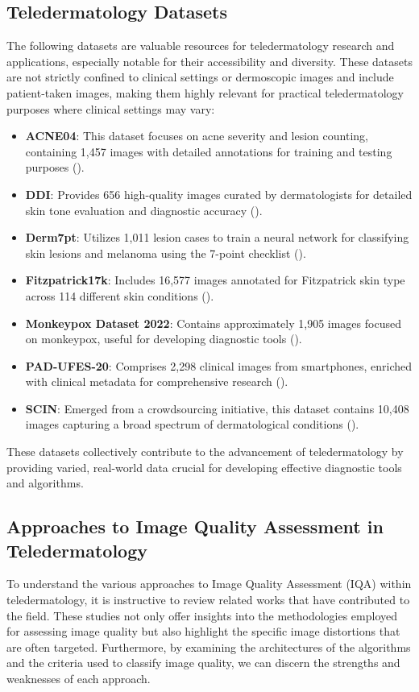 \subsection{Teledermatology Datasets}
\label{sub:DatasetsTD}
The following datasets are valuable resources for teledermatology research and applications, especially notable for their accessibility and diversity. These datasets are not strictly confined to clinical settings or dermoscopic images and include patient-taken images, making them highly relevant for practical teledermatology purposes where clinical settings may vary:
\begin{itemize}
    \item \textbf{ACNE04}: This dataset focuses on acne severity and lesion counting, containing 1,457 images with detailed annotations for training and testing purposes (\cite{ACNE04}).
    \item \textbf{DDI}: Provides 656 high-quality images curated by dermatologists for detailed skin tone evaluation and diagnostic accuracy (\cite{DDI}).
    \item \textbf{Derm7pt}: Utilizes 1,011 lesion cases to train a neural network for classifying skin lesions and melanoma using the 7-point checklist (\cite{Derm7pt}).
    \item \textbf{Fitzpatrick17k}: Includes 16,577 images annotated for Fitzpatrick skin type across 114 different skin conditions (\cite{F17K}).
    \item \textbf{Monkeypox Dataset 2022}: Contains approximately 1,905 images focused on monkeypox, useful for developing diagnostic tools (\cite{Monkeypox}).
    \item \textbf{PAD-UFES-20}: Comprises 2,298 clinical images from smartphones, enriched with clinical metadata for comprehensive research (\cite{PAD-UFES-20}).
    \item \textbf{SCIN}: Emerged from a crowdsourcing initiative, this dataset contains 10,408 images capturing a broad spectrum of dermatological conditions (\cite{SCIN}).
\end{itemize}
\vspace{\baselineskip}
\noindent
These datasets collectively contribute to the advancement of teledermatology by providing varied, real-world data crucial for developing effective diagnostic tools and algorithms. \par 

\subsection{Approaches to Image Quality Assessment in Teledermatology}
\label{sub:ApproachesIQAinTeledermatology}
To understand the various approaches to Image Quality Assessment (IQA) within teledermatology, it is instructive to review related works that have contributed to the field. These studies not only offer insights into the methodologies employed for assessing image quality but also highlight the specific image distortions that are often targeted. Furthermore, by examining the architectures of the algorithms and the criteria used to classify image quality, we can discern the strengths and weaknesses of each approach. \par

